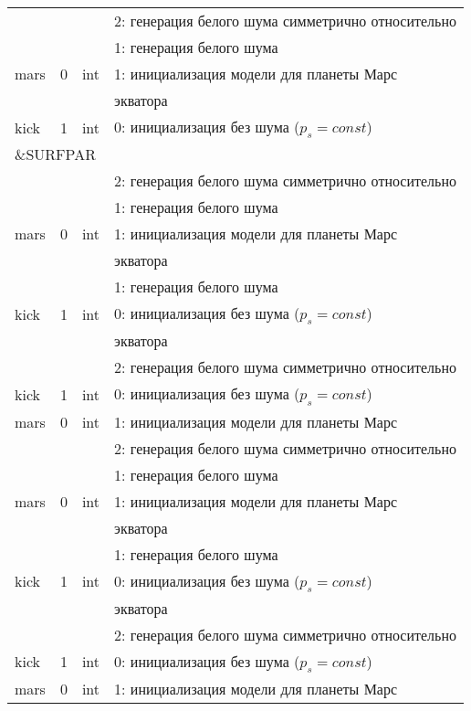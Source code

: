 \begin{longtable}[c]{|l|c|l|l|}
    &   &     & 2: генерация белого шума симметрично относительно \\
          &   &     & 1: генерация белого шума                  \\
          mars & 0 & int & 1: инициализация модели для планеты Марс     \\
      & & & экватора    \\
     \hline
      kick & 1 & int & 0: инициализация без шума (\(p_s = const\)) \\
     \multicolumn{4}{|l|}{\&SURFPAR}        \\ \hline
    &   &     & 2: генерация белого шума симметрично относительно \\
          &   &     & 1: генерация белого шума                  \\
          mars & 0 & int & 1: инициализация модели для планеты Марс     \\
      & & & экватора    \\
     &   &     & 1: генерация белого шума                  \\
    kick & 1 & int & 0: инициализация без шума (\(p_s = const\)) \\
          & & & экватора    \\
          &   &     & 2: генерация белого шума симметрично относительно \\
      kick & 1 & int & 0: инициализация без шума (\(p_s = const\)) \\
     mars & 0 & int & 1: инициализация модели для планеты Марс     \\
    &   &     & 2: генерация белого шума симметрично относительно \\
          &   &     & 1: генерация белого шума                  \\
          mars & 0 & int & 1: инициализация модели для планеты Марс     \\
      & & & экватора    \\
     &   &     & 1: генерация белого шума                  \\
    kick & 1 & int & 0: инициализация без шума (\(p_s = const\)) \\
          & & & экватора    \\
          &   &     & 2: генерация белого шума симметрично относительно \\
      kick & 1 & int & 0: инициализация без шума (\(p_s = const\)) \\
     mars & 0 & int & 1: инициализация модели для планеты Марс     \\

\end{longtable}

